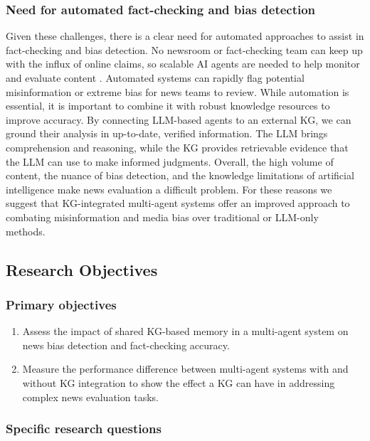 \documentclass{scrartcl}
\begin{document}
\subsubsection{Need for automated fact-checking and bias detection}
Given these challenges, there is a clear need for automated approaches to assist in fact-checking and bias detection. No newsroom or fact-checking team can keep up with the influx of online claims, so scalable AI agents are needed to help monitor and evaluate content \cite{r12}. Automated systems can rapidly flag potential misinformation or extreme bias for news teams to review. While automation is essential, it is important to combine it with robust knowledge resources to improve accuracy. By connecting LLM-based agents to an external KG, we can ground their analysis in up-to-date, verified information. The LLM brings comprehension and reasoning, while the KG provides retrievable evidence that the LLM can use to make informed judgments.
Overall, the high volume of content, the nuance of bias detection, and the knowledge limitations of artificial intelligence make news evaluation a difficult problem. For these reasons we suggest that KG-integrated multi-agent systems offer an improved approach to combating misinformation and media bias over traditional or LLM-only methods.  



\subsection{Research Objectives}
\subsubsection{Primary objectives}

\begin{enumerate}
    \item Assess the impact of shared KG-based memory in a multi-agent system on news bias detection and fact-checking accuracy.

    \item Measure the performance difference between multi-agent systems with and without KG integration to show the effect a KG can have in addressing complex news evaluation tasks.
\end{enumerate}

\subsubsection{Specific research questions}
\end{document}

